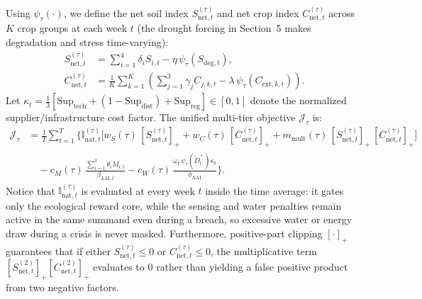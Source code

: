 \documentclass[11pt,a4paper]{article}
\newcommand{\pos}[1]{\left[#1\right]_{+}}
\newcommand{\Inatt}{\mathbb{I}_{\mathrm{nat},t}}
\newcommand{\AAI}{\mathrm{AAI}}
\begin{document}
Using $\psi_\tau(\cdot)$, we define the net soil index $S_{\mathrm{net},t}^{(\tau)}$ and net crop index $C_{\mathrm{net},t}^{(\tau)}$ across $K$ crop groups at each week $t$ (the drought forcing in Section~5 makes degradation and stress time-varying):
\begin{align}
  S_{\mathrm{net},t}^{(\tau)} &= \sum_{i=1}^{4} \delta_i S_{i,t} - \eta\,\psi_\tau\!\left(S_{\mathrm{deg},t}\right), \\
  C_{\mathrm{net},t}^{(\tau)} &= \frac{1}{K}\sum_{k=1}^{K}\left(\sum_{j=1}^{3} \gamma_j C_{j,k,t} - \lambda\,\psi_\tau\!\left(C_{\mathrm{ext},k,t}\right)\right).
\end{align}
Let $\kappa_t = \frac{1}{3}\left[\mathrm{Sup}_{\mathrm{tech}} + (1 - \mathrm{Sup}_{\mathrm{dist}}) + \mathrm{Sup}_{\mathrm{reg}}\right] \in [0,1]$ denote the normalized supplier/infrastructure cost factor. The unified multi-tier objective $\mathcal{J}_{\tau}$ is:
\begin{align}
  \mathcal{J}_{\tau} &= \frac{1}{T}\sum_{t=1}^{T}\Bigg\{ \Inatt^{(\tau)} \Big[ w_S(\tau)\,\pos{S_{\mathrm{net},t}^{(\tau)}} + w_C(\tau)\,\pos{C_{\mathrm{net},t}^{(\tau)}} + m_{\mathrm{mult}}(\tau)\,\pos{S_{\mathrm{net},t}^{(\tau)}}\,\pos{C_{\mathrm{net},t}^{(\tau)}} \Big] \nonumber\\
  &\quad - c_M(\tau)\,\frac{\sum_{i=1}^{3}\theta_i M_{i,t}}{\beta_{\AAI,t}} - c_W(\tau)\, \frac{\omega_t\,\psi_\tau\!\left(\tilde{D}_t^+\right)\kappa_t}{\phi_{\AAI}} \Bigg\}.
  \label{eq:unified_objective}
\end{align}
Notice that $\Inatt^{(\tau)}$ is evaluated at every week $t$ inside the time average: it gates only the ecological reward core, while the sensing and water penalties remain active in the same summand even during a breach, so excessive water or energy draw during a crisis is never masked. Furthermore, positive-part clipping $\pos{\cdot}$ guarantees that if either $S_{\mathrm{net},t}^{(\tau)} \le 0$ or $C_{\mathrm{net},t}^{(\tau)} \le 0$, the multiplicative term $\pos{S_{\mathrm{net},t}^{(2)}}\pos{C_{\mathrm{net},t}^{(2)}}$ evaluates to $0$ rather than yielding a false positive product from two negative factors.
\end{document}
